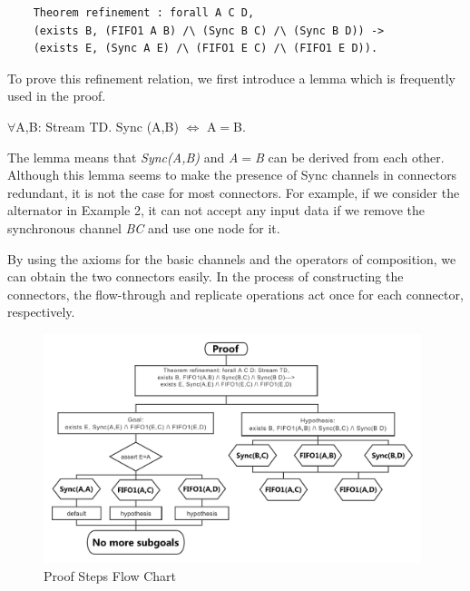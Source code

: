 \documentclass{llncs}
\begin{document}
\begin{example}[Refinement]
\begin{verbatim}
    Theorem refinement : forall A C D,
    (exists B, (FIFO1 A B) /\ (Sync B C) /\ (Sync B D)) ->
    (exists E, (Sync A E) /\ (FIFO1 E C) /\ (FIFO1 E D)).
\end{verbatim}



To prove this refinement relation, we first introduce a lemma which is frequently used in the proof.
\begin{lemma}[Eq]\label{lemma:eq}
$\forall$A,B: Stream TD.
  Sync (A,B) $\Leftrightarrow$ A$=$B.
\end{lemma}
The lemma means that \emph{Sync(A,B)} and \emph{A$=$B} can be derived
from each other. Although this lemma seems to make the presence of
Sync channels in connectors redundant, it is not the case for most
connectors. For example, if we consider
the alternator in Example 2, it can not accept any input data if we
remove the synchronous channel \emph{BC} and use one node for it.

By using the axioms for the basic channels and the operators of composition, we can obtain the two connectors easily.
In the process of constructing the connectors, the flow-through and replicate operations act once for each connector, respectively.


\begin{figure}[htbp]
\centering
\includegraphics[width=11cm]{Refinement.pdf}
\caption{Proof Steps Flow Chart}
\label{fig:equivalence}
\end{figure}


\end{example}
\end{document}
